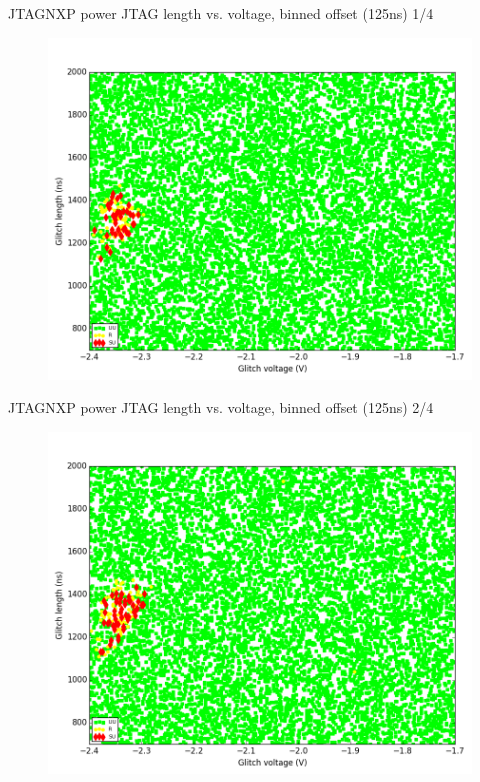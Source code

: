 \documentclass[table]{beamer}
\begin{document}
\begin{frame}{JTAG}{NXP power JTAG length vs. voltage, binned offset (125ns) 1/4}
    \vspace{-.3cm}
    \begin{figure}[H]
      \centering
      \includegraphics[width=.8\textwidth]{../../plots/newplots/nxp-jtag-voltage-length-1.png}
    \end{figure}
\end{frame}
\begin{frame}{JTAG}{NXP power JTAG length vs. voltage, binned offset (125ns) 2/4}
    \vspace{-.3cm}
    \begin{figure}[H]
      \centering
      \includegraphics[width=.8\textwidth]{../../plots/newplots/nxp-jtag-voltage-length-2.png}
    \end{figure}
\end{frame}
\end{document}
